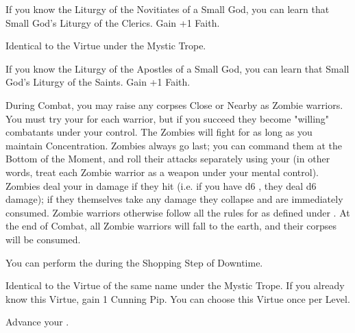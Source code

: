 \begin{multicols*}{2}

If you know the Liturgy of the Novitiates of a Small God, you can learn that Small God's Liturgy of the Clerics. Gain +1 \MAX Faith.


Identical to the  Virtue under the Mystic Trope.


If you know the Liturgy of the Apostles of a Small God, you can learn that Small God's Liturgy of the Saints. Gain +1 \MAX Faith.

\newpage


During Combat, you may raise any corpses Close or Nearby as Zombie warriors. You must try your \JUJU for each warrior, but if you succeed they become "willing" combatants under your control. The Zombies will fight for as long as you maintain Concentration. Zombies always go last; you can command them at the Bottom of the Moment, and roll their attacks separately using your \FOC (in other words, treat each Zombie warrior as a \FOC weapon under your mental control). Zombies deal your \JUJU in damage if they hit (i.e. if you have d6 \JUJU, they deal d6 damage); if they themselves take any damage they collapse and are immediately consumed. Zombie warriors otherwise follow all the rules for  as defined under .  At the end of Combat, all Zombie warriors will fall to the earth, and their corpses will be consumed. 


You can perform the  during the Shopping Step of Downtime. 



Identical to the Virtue of the same name under the Mystic Trope. If you already know this Virtue, gain 1 Cunning Pip. You can choose this Virtue once per Level.



Advance your \JUJU \DCUP.  




\end{multicols*}
